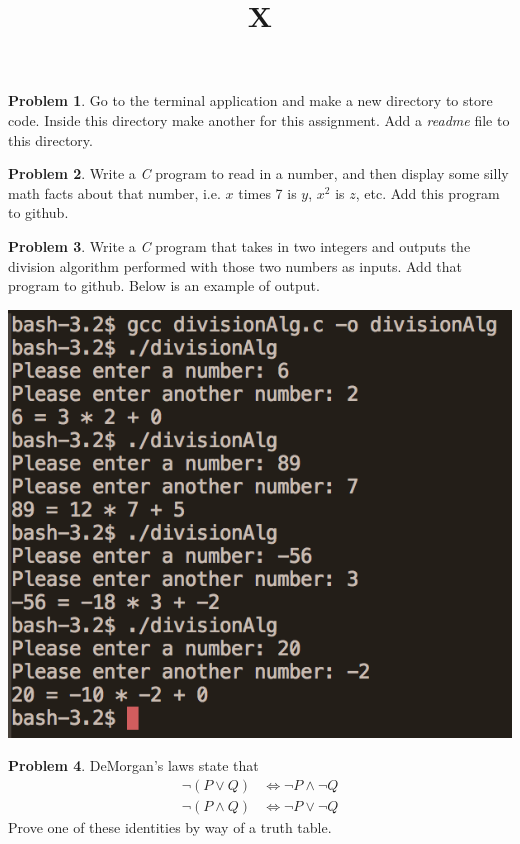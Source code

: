 \documentclass{article}
\title{X}
\numberwithin{pic}{section}
\numberwithin{lem}{section}
\numberwithin{thm}{section}
\numberwithin{cor}{section}
\theoremstyle{definition}
\numberwithin{ex}{section}
\numberwithin{defn}{section}
\theoremstyle{definition}
\newtheorem{prob}{Problem}
\theoremstyle{remark}
\begin{document}
\fancyhead[r]{\today}
\pagestyle{fancy}


\begin{prob}
  Go to the terminal application and make a new directory to store code. Inside this directory make another for this assignment. Add a \textit{readme} file to this directory.
\end{prob}

\begin{prob}
  Write a \textit{C} program to read in a number, and then display some silly math facts about that number, i.e. $x$ times 7 is $y$, $x^2$ is $z$, etc. Add this program to github.
\end{prob}

\begin{prob}
  Write a \textit{C} program that takes in two integers and outputs the division algorithm performed with those two numbers as inputs. Add that program to github. Below is an example of output.\\
  \begin{center}
    \includegraphics[scale=0.5]{soln1}
  \end{center}
\end{prob}

\begin{prob}
  DeMorgan's laws state that
  \begin{align}
    \neg(P \vee Q) &\iff \neg P \wedge \neg Q\\
    \neg(P \wedge Q) &\iff \neg P \vee \neg Q
  \end{align}
  Prove one of these identities by way of a truth table.
\end{prob}
\end{document}
